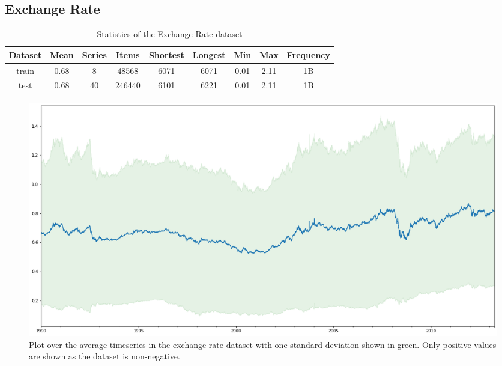 \clearpage
\subsection{Exchange Rate}

\begin{table}[htb]
    \begin{tabular}{||c | c c c c c c c c ||}
        \hline
        Dataset & Mean & Series & Items  & Shortest & Longest & Min  & Max  & Frequency \\ [0.5ex]
        \hline\hline
        train   & 0.68 & 8      & 48568  & 6071     & 6071    & 0.01 & 2.11 & 1B        \\
        \hline
        test    & 0.68 & 40     & 246440 & 6101     & 6221    & 0.01 & 2.11 & 1B        \\
        \hline
    \end{tabular}
    \caption{Statistics of the Exchange Rate dataset}
\end{table}

\begin{figure}[htb]
    \centering
    \includegraphics[width=\linewidth]{./img/exchange_rate_plot.png}
    \caption{Plot over the average timeseries in the exchange rate dataset with one standard deviation shown in green. Only positive values are shown as the dataset is non-negative.}
    \label{fig:exchange_rate_plot}
    \endminipage\hfill
\end{figure}

